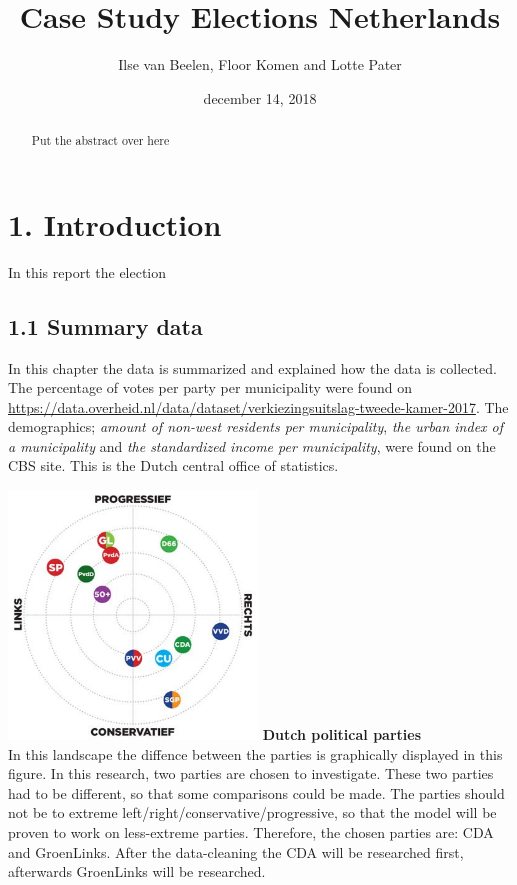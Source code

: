 \documentclass[11pt,]{article}
\title{Case Study Elections Netherlands}
\author{Ilse van Beelen, Floor Komen and Lotte Pater}
\date{december 14, 2018}
\begin{document}
\maketitle
\begin{abstract}
Put the abstract over here
\end{abstract}

\section{1. Introduction}\label{introduction}

In this report the election

\subsection{1.1 Summary data}\label{summary-data}

In this chapter the data is summarized and explained how the data is
collected. The percentage of votes per party per municipality were found
on
\url{https://data.overheid.nl/data/dataset/verkiezingsuitslag-tweede-kamer-2017}.
The demographics; \emph{amount of non-west residents per municipality},
\emph{the urban index of a municipality} and \emph{the standardized
income per municipality}, were found on the CBS site. This is the Dutch
central office of statistics.

\includegraphics[width=2.60417in]{Partijlandschap.jpg} \textbf{Dutch
political parties}\\
In this landscape the diffence between the parties is graphically
displayed in this figure. In this research, two parties are chosen to
investigate. These two parties had to be different, so that some
comparisons could be made. The parties should not be to extreme
left/right/conservative/progressive, so that the model will be proven to
work on less-extreme parties. Therefore, the chosen parties are: CDA and
GroenLinks. After the data-cleaning the CDA will be researched first,
afterwards GroenLinks will be researched.
\end{document}
